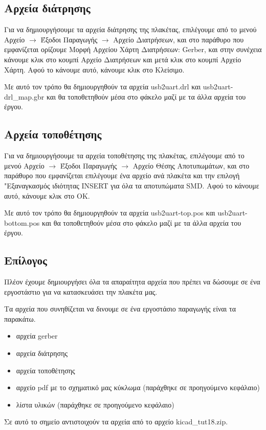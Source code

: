 \documentclass[a4paper]{article}
\begin{document}
\subsection{Αρχεία διάτρησης}
Για να δημιουργήσουμε τα αρχεία διάτρησης της πλακέτας, επιλέγουμε από το μενού Αρχείο $\rightarrow$ Έξοδοι Παραγωγής $\rightarrow$ Αρχείο Διατρήσεων, και στο παράθυρο που εμφανίζεται ορίζουμε Μορφή Αρχείου Χάρτη Διατρήσεων: Gerber, και στην συνέχεια κάνουμε κλικ στο κουμπί Αρχείο Διατρήσεων και μετά κλικ στο κουμπί Αρχείο Χάρτη. Αφού το κάνουμε αυτό, κάνουμε κλικ στο Κλείσιμο.

\begin{figure}
  \begin{center}
    \label{fig:kicad-main}
  \end{center}
\end{figure}

Με αυτό τον τρόπο θα δημιουργηθούν τα αρχεία usb2uart.drl και usb2uart-drl\_map.gbr και θα τοποθετηθούν μέσα στο φάκελο μαζί με τα άλλα αρχεία του έργου.

\subsection{Αρχεία τοποθέτησης}
Για να δημιουργήσουμε τα αρχεία τοποθέτησης της πλακέτας, επιλέγουμε από το μενού Αρχείο $\rightarrow$ Έξοδοι Παραγωγής $\rightarrow$ Αρχείο Θέσης Αποτυπωμάτων, και στο παράθυρο που εμφανίζεται επιλέγουμε ένα αρχείο ανά πλακέτα και την επιλογή "Εξαναγκασμός ιδιότητας INSERT για όλα τα αποτυπώματα SMD. Αφού το κάνουμε αυτό, κάνουμε κλικ στο OK.

Με αυτό τον τρόπο θα δημιουργηθούν τα αρχεία usb2uart-top.pos και usb2uart-bottom.pos και θα τοποθετηθούν μέσα στο φάκελο μαζί με τα άλλα αρχεία του έργου.

\subsection{Επίλογος}
Πλέον έχουμε δημιουργήσει όλα τα απαραίτητα αρχεία που πρέπει να δώσουμε σε ένα εργοστάστιο για να κατασκευάσει την πλακέτα μας.

Τα αρχεία που συνηθίζεται να δινουμε σε ένα εργοστάσιο παραγωγής είναι τα παρακάτω.

\begin{itemize}
    \item αρχεία gerber
    \item αρχεία διάτρησης
    \item αρχεία τοποθέτησης
    \item αρχείο pdf με το σχηματικό μας κύκλωμα (παράχθηκε σε προηγούμενο κεφάλαιο)
    \item λίστα υλικών (παράχθηκε σε προηγούμενο κεφάλαιο)
\end{itemize}

Σε αυτό το σημείο αντιστοιχούν τα αρχεία από το αρχείο kicad\_tut18.zip.

  
\end{document}
